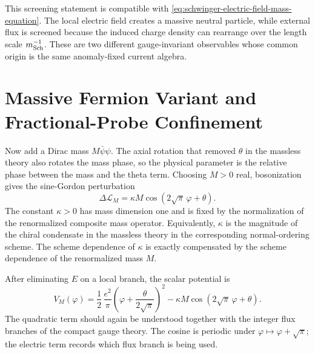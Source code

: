 This screening statement is compatible with
\eqref{eq:schwinger-electric-field-mass-equation}.  The local electric field
creates a massive neutral particle, while external flux is screened because
the induced charge density can rearrange over the length scale
\(m_{\rm Sch}^{-1}\).  These are two different gauge-invariant observables
whose common origin is the same anomaly-fixed current algebra.

\section{Massive Fermion Variant and Fractional-Probe Confinement}

Now add a Dirac mass \(M\bar\psi\psi\).  The axial rotation that removed
\(\theta\) in the massless theory also rotates the mass phase, so the
physical parameter is the relative phase between the mass and the theta
term.  Choosing \(M>0\) real, bosonization gives the sine-Gordon perturbation
\begin{equation}
  \Delta\mathcal L_M
  =
  \kappa M\cos(2\sqrt\pi\,\varphi+\theta).
  \label{eq:massive-schwinger-sine-gordon-perturbation}
\end{equation}
The constant \(\kappa>0\) has mass dimension one and is fixed by the
normalization of the renormalized composite mass operator.  Equivalently,
\(\kappa\) is the magnitude of the chiral condensate in the massless theory
in the corresponding normal-ordering scheme.  The scheme dependence of
\(\kappa\) is exactly compensated by the scheme dependence of the
renormalized mass \(M\).

After eliminating \(E\) on a local branch, the scalar potential is
\begin{equation}
  V_M(\varphi)
  =
  \frac12\,\frac{e^2}{\pi}
  \left(\varphi+\frac{\theta}{2\sqrt\pi}\right)^2
  -\kappa M\cos(2\sqrt\pi\,\varphi+\theta).
  \label{eq:massive-schwinger-effective-potential}
\end{equation}
The quadratic term should again be understood together with the integer flux
branches of the compact gauge theory.  The cosine is periodic under
\(\varphi\mapsto\varphi+\sqrt\pi\); the electric term records which flux
branch is being used.

